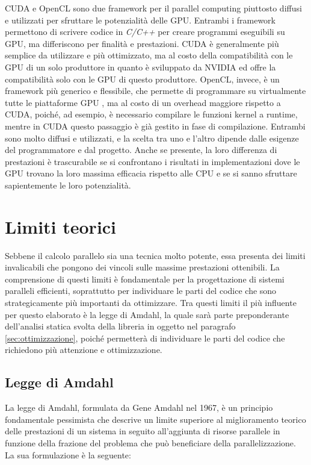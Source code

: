 CUDA e OpenCL sono due framework per il parallel computing piuttosto diffusi e utilizzati
per sfruttare le potenzialità delle GPU. Entrambi i framework permettono di
scrivere codice in \textit{C/C++} per creare programmi eseguibili su GPU, ma
differiscono per finalità e prestazioni. CUDA è generalmente più semplice da utilizzare
e più ottimizzato, ma al costo della compatibilità con le GPU di un solo
produttore in quanto è sviluppato da NVIDIA ed offre la compatibilità solo con
le GPU di questo produttore. OpenCL, invece, è un framework più generico e flessibile,
che permette di programmare su virtualmente tutte le piattaforme GPU , ma al
costo di un overhead maggiore rispetto a CUDA, poiché, ad esempio, è necessario compilare
le funzioni kernel a runtime, mentre in CUDA questo passaggio è già gestito in
fase di compilazione. Entrambi sono molto diffusi e utilizzati, e la scelta tra
uno e l'altro dipende dalle esigenze del programmatore e dal progetto. Anche se presente,
la loro differenza di prestazioni è trascurabile se si confrontano i risultati
in implementazioni dove le GPU trovano la loro massima efficacia rispetto alle
CPU e se si sanno sfruttare sapientemente le loro potenzialità.

\section{Limiti teorici}
\label{sec:limititeorici}

Sebbene il calcolo parallelo sia una tecnica molto potente, essa presenta dei
limiti invalicabili che pongono dei vincoli sulle massime prestazioni ottenibili.
La comprensione di questi limiti è fondamentale per la progettazione di sistemi paralleli
efficienti, soprattutto per individuare le parti del codice che sono
strategicamente più importanti da ottimizzare. Tra questi limiti il più influente
per questo elaborato è la legge di Amdahl, la quale sarà parte preponderante
dell'analisi statica svolta della libreria in oggetto nel paragrafo
\ref{sec:ottimizzazione}, poiché permetterà di individuare le parti del codice che
richiedono più attenzione e ottimizzazione.

\subsection{Legge di Amdahl}
\label{sec:amdahl}

La legge di Amdahl, formulata da Gene Amdahl nel 1967, è un principio
fondamentale pessimista che descrive un limite superiore al miglioramento
teorico delle prestazioni di un sistema in seguito all'aggiunta di risorse
parallele in funzione della frazione del problema che può beneficiare della
parallelizzazione. La sua formulazione è la seguente:

